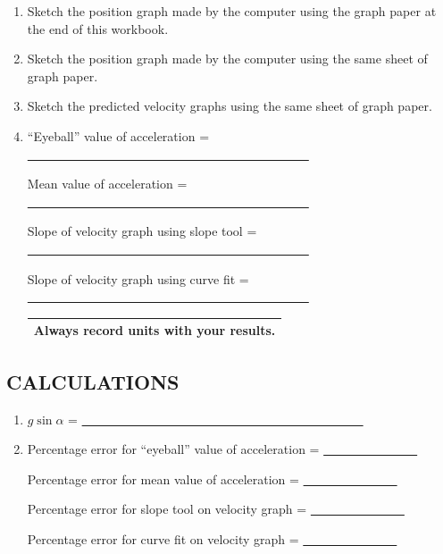 \begin{enumerate}[label=\arabic*.]

\item Sketch the position graph made by the computer using the graph paper at the end of this workbook.

\item Sketch the position graph made by the computer using the same sheet of graph paper.

\item Sketch the predicted velocity graphs using the same sheet of graph paper.

\setcounter{enumi}{8}
\item ``Eyeball'' value of acceleration = \ul{~~~~~~~~~~~~~~~~~~~~~~~~~~~~~~~~~~~~~~~~~~~~~}

Mean value of acceleration = \ul{~~~~~~~~~~~~~~~~~~~~~~~~~~~~~~~~~~~~~~~~~~~~~}

Slope of velocity graph using slope tool = \ul{~~~~~~~~~~~~~~~~~~~~~~~~~~~~~~~~~~~~~~~~~~~~~}

Slope of velocity graph using curve fit = \ul{~~~~~~~~~~~~~~~~~~~~~~~~~~~~~~~~~~~~~~~~~~~~~}

\begin{center}
\begin{tabular}{|p{14cm}|}
\hline\tstrut
Always record units with your results.  \bstrut\\
\hline
\end{tabular}
\end{center}

\end{enumerate}

\subsection*{CALCULATIONS}

\begin{enumerate}[start=7]

\item \(g\sin\alpha\) = \ul{~~~~~~~~~~~~~~~~~~~~~~~~~~~~~~~~~~~~~~~~~~~~~}

\setcounter{enumi}{9}
\item Percentage error for ``eyeball'' value of acceleration = \ul{~~~~~~~~~~~~~~~}

Percentage error for mean value of acceleration = \ul{~~~~~~~~~~~~~~~}

Percentage error for slope tool on velocity graph = \ul{~~~~~~~~~~~~~~~}

Percentage error for curve fit on velocity graph = \ul{~~~~~~~~~~~~~~~}

\end{enumerate}


